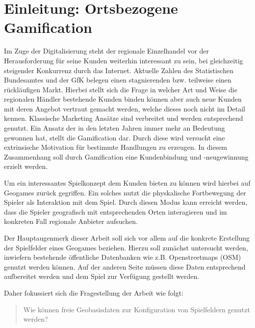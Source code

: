 \chapter{Einleitung: Ortsbezogene Gamification}
\label{ch1:Einleitung}

Im Zuge der Digitalisierung steht der regionale Einzelhandel vor der Herausforderung für seine Kunden weiterhin interessant zu sein, bei gleichzeitig steigender Konkurrenz durch das Internet. Aktuelle Zahlen des Statistischen Bundesamtes \citep{DWN.2012} und der GfK belegen einen stagnierenden bzw. teilweise einen rückläufigen Markt.
Hierbei stellt sich die Frage in welcher Art und Weise die regionalen Händler bestehende Kunden binden können aber auch neue Kunden mit deren Angebot vertraut gemacht werden, welche dieses noch nicht im Detail kennen.
Klassische Marketing Ansätze sind verbreitet und werden entsprechend genutzt.
Ein Ansatz der in den letzten Jahren immer mehr an Bedeutung gewonnen hat, stellt die Gamification dar. Durch diese wird versucht eine extrinsische Motivation für bestimmte Handlungen zu erzeugen. In diesem Zusammenhang soll durch Gamification eine Kundenbindung und -neugewinnung erzielt werden.

Um ein interessantes Spielkonzept dem Kunden bieten zu können wird hierbei auf Geogames zurück gegriffen.
Ein solches nutzt die physkalische Fortbewegung der Spieler als Interaktion mit dem Spiel.
Durch diesen Modus kann erreicht werden, dass die Spieler geografisch mit entsprechenden Orten interagieren und im konkreten Fall regionale Anbieter aufsuchen.

Der Hauptaugenmerk dieser Arbeit soll sich vor allem auf die konkrete Erstellung der Spielfelder eines Geogames beziehen. Hierzu soll zunächst untersucht werden, inwiefern bestehende öffentliche Datenbanken wie z.B. Openstreetmaps (OSM) genutzt werden können. Auf der anderen Seite müssen diese Daten entsprechend aufbereitet werden und dem Spiel zur Verfügung gestellt werden.

Daher fokussiert sich die Fragestellung der Arbeit wie folgt:
\begin{quote}
  \item Wie können freie Geobasisdaten zur Konfiguration von Spielfeldern genutzt werden?
\end{quote}


